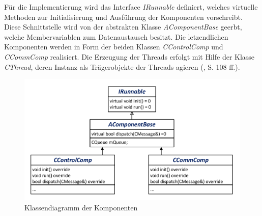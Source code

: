Für die Implementierung wird das Interface \textit{IRunnable} definiert, welches virtuelle Methoden zur Initialisierung und Ausführung der Komponenten vorschreibt. Diese Schnittstelle wird von der abstrakten Klasse \textit{AComponentBase} geerbt, welche Membervariablen zum Datenaustausch besitzt. Die letzendlichen Komponenten werden in Form der beiden Klassen \textit{CControlComp} und \textit{CCommComp} realisiert. Die Erzeugung der Threads erfolgt mit Hilfe der Klasse \textit{CThread}, deren Instanz als Trägerobjekte der Threads agieren (\cite{Wietzke1}, S. 108 ff.).
\begin{figure}[!h]
\centering
\includegraphics[width=0.6\linewidth]{img/SW_1_KA_KD.pdf}
\caption{Klassendiagramm der Komponenten}
\end{figure}

